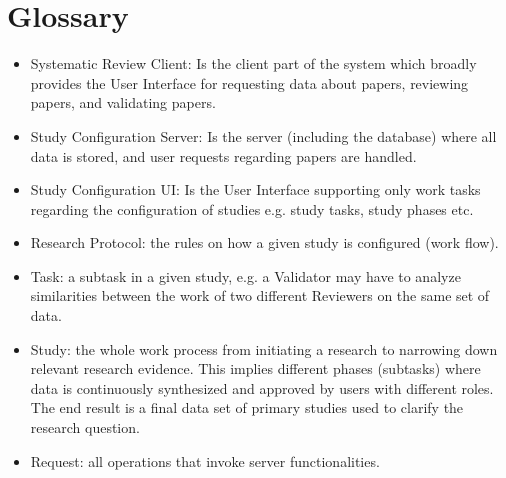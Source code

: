 \section{Glossary}

\begin{itemize}

\item Systematic Review Client: Is the client part of the system which broadly provides the User Interface for requesting data about papers, reviewing papers, and validating papers.
\item Study Configuration Server: Is the server (including the database) where all data is stored, and user requests regarding papers are handled.
\item Study Configuration UI: Is the User Interface supporting only work tasks regarding the configuration of studies e.g. study tasks, study phases etc.
\item Research Protocol: the rules on how a given study is configured (work flow).
\item Task: a subtask in a given study, e.g. a Validator may have to analyze similarities between the work of two different Reviewers on the same set of data. 
\item Study: the whole work process from initiating a research to narrowing down relevant research evidence. This implies different phases (subtasks) where data is continuously synthesized and approved by users with different roles. The end result is a final data set of primary studies used to clarify the research question. 
\item Request: all operations that invoke server functionalities. 
\end{itemize}
